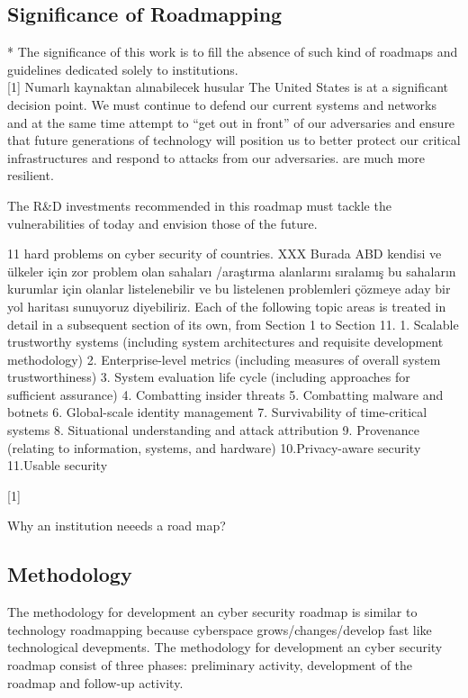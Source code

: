 \documentclass[journal]{IEEEtran}
\begin{document}
\subsection{Significance of Roadmapping}
* The significance of this work is to fill the absence of such kind of roadmaps and guidelines  dedicated solely to institutions.
\\

[1] Numarlı kaynaktan alınabilecek husular
The United States is at a significant decision point. We must continue to defend our current systems and networks and at the same time attempt to “get out in front” of our adversaries and ensure that future generations of technology will position us to better protect our critical infrastructures and respond to attacks from our adversaries.
are much more resilient.

The R\&D investments recommended in this roadmap must tackle the vulnerabilities of today and envision those of the future.

11 hard problems on cyber security of countries.
XXX Burada ABD kendisi ve ülkeler için zor problem olan sahaları /araştırma alanlarını sıralamış bu sahaların kurumlar için olanlar listelenebilir ve bu listelenen problemleri çözmeye aday bir yol haritası sunuyoruz diyebiliriz.
Each of the following topic areas is treated in detail in a subsequent section of its own, from Section 1 to Section 11.
1. Scalable trustworthy systems (including system architectures and requisite development methodology)
2. Enterprise-level metrics (including measures of overall system trustworthiness)
3. System evaluation life cycle (including approaches for sufficient assurance)
4. Combatting insider threats
5. Combatting malware and botnets
6. Global-scale identity management
7. Survivability of time-critical systems
8. Situational understanding and attack attribution
9. Provenance (relating to information, systems, and hardware)
10.Privacy-aware security
11.Usable security

 [1]

Why an institution neeeds a road map?

\subsection{Methodology}
The methodology for development an cyber security roadmap  is similar to technology roadmapping because cyberspace grows/changes/develop fast like technological devepments. The methodology for development an cyber security roadmap consist of three phases: preliminary activity, development of the roadmap and follow-up activity.\cite{maughan2009roadmap} 
\end{document}
